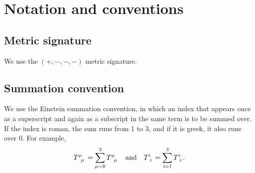 \chapter*{Notation and conventions} %

\section*{Metric signature}

We use the $(+,-,-,-)$ metric signature.

\section*{Summation convention}

We use the Einstein summation convention, in which an index that appears once as a superscript and again as a subscript in the same term is to be summed over.
If the index is roman, the sum runs from $1$ to $3$, and if it is greek, it also runs over $0$.
For example,
\begin{equation*}
	T\indices{^\mu_\mu} = \sum_{\mu=0}^3 T\indices{^\mu_\mu}
	\quad \text{and} \quad
	T\indices{^i_i} = \sum_{i=1}^3 T\indices{^i_i}
	.
\end{equation*}

\iffalse
\section*{Fourier transformation}

We use the Fourier transformation convention
\begin{equation}
	f(k) = \int \dif x \, e^{i k x} f(x)
	\qquad \text{and} \qquad
	f(x) = \int \frac{\dif k}{2 \pi} \, e^{-i k x} f(k) .
\end{equation}
With this convention, the delta function $\delta(x' - x)$ is given by the highlighted part of
\begin{equation}
	f(x) = \int \frac{\dif k}{2 \pi} \, e^{-i k x} f(k)
	     = \int \dif x' \underbrace{\int \frac{\dif k}{2 \pi} \, e^{i k (x'-x)}}_{\displaystyle \delta(x'-x)} f(k) .
\label{eq:pre:delta_function}
\end{equation}
\fi



